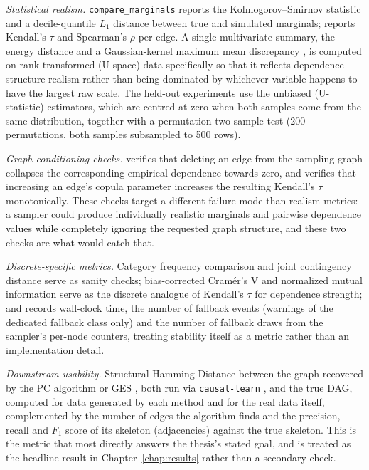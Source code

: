 \documentclass[
  english,
  class=report,
  accentcolor=2c,
  marginpar=false,
  parskip=half-,
  fontsize=11pt,
  ruledheaders=false,
  pdfa=false,
  IMRAD=false,
  thesis={type=master}
]{tudapub}
\begin{document}
\emph{Statistical realism.} \texttt{compare\_marginals} reports the
Kolmogorov--Smirnov statistic and a decile-quantile $L_1$ distance between
true and simulated marginals;  reports
Kendall's $\tau$ and Spearman's $\rho$ per edge. A single multivariate
summary, the energy distance \parencite{szekely2013} and a Gaussian-kernel
maximum mean discrepancy \parencite{gretton2012}, is computed on
rank-transformed (U-space) data specifically so that it reflects
dependence-structure realism rather than being dominated by whichever
variable happens to have the largest raw scale. The held-out experiments
use the unbiased (U-statistic) estimators, which are centred at zero when
both samples come from the same distribution, together with a permutation
two-sample test (200 permutations, both samples subsampled to 500 rows).

\emph{Graph-conditioning checks.}  verifies
that deleting an edge from the sampling graph collapses the corresponding
empirical dependence towards zero, and 
verifies that increasing an edge's copula parameter increases the resulting
Kendall's $\tau$ monotonically. These checks target a different failure mode
than realism metrics: a sampler could produce individually realistic
marginals and pairwise dependence values while completely ignoring the
requested graph structure, and these two checks are what would catch that.

\emph{Discrete-specific metrics.} Category frequency comparison and joint
contingency distance serve as sanity checks; bias-corrected Cram\'er's V
\parencite{bergsma2013} and
normalized mutual information serve as the discrete analogue of Kendall's
$\tau$ for dependence strength; and 
records wall-clock time, the number of fallback events (warnings of the
dedicated fallback class only) and the number of fallback draws from the
sampler's per-node counters, treating stability itself as a metric rather
than an implementation detail.

\emph{Downstream usability.} Structural Hamming Distance between the graph
recovered by the PC algorithm \parencite{spirtes2000} or GES
\parencite{chickering2002}, both run via
\texttt{causal-learn} \parencite{zheng2024}, and the true DAG, computed for
data generated by each method and for the real data itself, complemented by
the number of edges the algorithm finds and the precision, recall and $F_1$ score of
its skeleton (adjacencies) against the true skeleton. This is the
metric that most directly answers the thesis's stated goal, and is treated
as the headline result in Chapter~\ref{chap:results} rather than a secondary
check.
\end{document}
